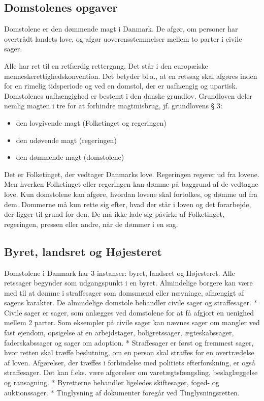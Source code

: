 \documentclass[]{book}
\providecommand{\tightlist}{%
  \setlength{\itemsep}{0pt}\setlength{\parskip}{0pt}}
\begin{document}
\hypertarget{domstolenes-opgaver}{%
\subsection{Domstolenes opgaver}\label{domstolenes-opgaver}}

Domstolene er den dømmende magt i Danmark. De afgør, om personer har overtrådt landets love, og afgør uoverensstemmelser mellem to parter i civile sager.

Alle har ret til en retfærdig rettergang. Det står i den europæiske menneskerettighedskonvention. Det betyder bl.a., at en retssag skal afgøres inden for en rimelig tidsperiode og ved en domstol, der er uafhængig og upartisk.\\
Domstolenes uafhængighed er bestemt i den danske grundlov. Grundloven deler nemlig magten i tre for at forhindre magtmisbrug, jf. grundlovens § 3:

\begin{itemize}
\tightlist
\item
  den lovgivende magt (Folketinget og regeringen)
\item
  den udøvende magt (regeringen)
\item
  den dømmende magt (domstolene)
\end{itemize}

Det er Folketinget, der vedtager Danmarks love. Regeringen regerer ud fra lovene. Men hverken Folketinget eller regeringen kan dømme på baggrund af de vedtagne love. Kun domstolene kan afgøre, hvordan lovene skal fortolkes, og dømme ud fra dem. Dommerne må kun rette sig efter, hvad der står i loven og det forarbejde, der ligger til grund for den. De må ikke lade sig påvirke af Folketinget, regeringen, pressen eller andre, når de dømmer i en sag.

\hypertarget{byret-landsret-og-hjesteret}{%
\subsection{Byret, landsret og Højesteret}\label{byret-landsret-og-hjesteret}}

Domstolene i Danmark har 3 instanser: byret, landsret og Højesteret. Alle retssager begynder som udgangspunkt i en byret. Almindelige borgere kan være med til at dømme i straffesager som domsmænd eller nævninge, afhængigt af sagens karakter.
De almindelige domstole behandler civile sager og straffesager.
* Civile sager er sager, som anlægges ved domstolene for at få afgjort en uenighed mellem 2 parter. Som eksempler på civile sager kan nævnes sager om mangler ved fast ejendom, opsigelse af en arbejdstager, boligretssager, ægteskabssager, faderskabssager og sager om adoption.
* Straffesager er først og fremmest sager, hvor retten skal træffe beslutning, om en person skal straffes for en overtrædelse af loven. Afgørelser, der træffes i forbindelse med politiets efterforskning, er også straffesager. Det kan f.eks. være afgørelser om varetægtsfængsling, beslaglæggelse og ransagning.
* Byretterne behandler ligeledes skiftesager, foged- og auktionssager.
* Tinglysning af dokumenter foregår ved Tinglysningsretten.
\end{document}
